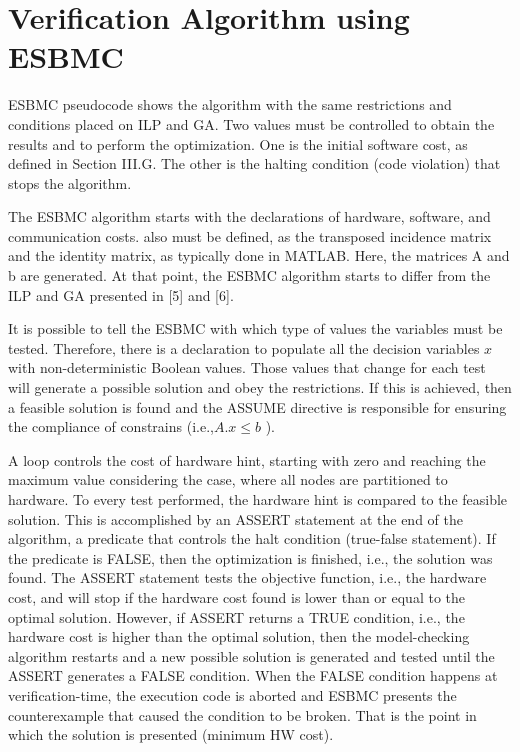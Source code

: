 \section{Verification Algorithm using ESBMC}

ESBMC pseudocode shows the algorithm with the same restrictions and conditions placed on ILP and GA. Two values must be controlled to obtain the results and to perform the optimization. One is the initial software cost, as defined in Section III.G. The other is the halting condition (code violation) that stops the algorithm.

The ESBMC algorithm starts with the declarations of hardware, software, and communication costs.  also must be defined, as the transposed incidence matrix and the identity matrix, as typically done in MATLAB. Here, the matrices A and b are generated. At that point, the ESBMC algorithm starts to differ from the ILP and GA presented in [5] and [6].

It is possible to tell the ESBMC with which type of values the variables must be tested. Therefore, there is a declaration to populate all the decision variables $ x $ with non-deterministic Boolean values. Those values that change for each test will generate a possible solution and obey the restrictions. If this is achieved, then a feasible solution is found and the ASSUME directive is responsible for ensuring the compliance of constrains (i.e.,$ A.x \leq b $ ).

A loop controls the cost of hardware hint, starting with zero and reaching the maximum value considering the case, where all nodes are partitioned to hardware. To every test performed, the hardware hint is compared to the feasible solution. This is accomplished by an ASSERT statement at the end of the algorithm, a predicate that controls the halt condition (true-false statement). If the predicate is FALSE, then the optimization is finished, i.e., the solution was found. The ASSERT statement tests the objective function, i.e., the hardware cost, and will stop if the hardware cost found is lower than or equal to the optimal solution. However, if ASSERT returns a TRUE condition, i.e., the hardware cost is higher than the optimal solution, then the model-checking algorithm restarts and a new possible solution is generated and tested until the ASSERT generates a FALSE condition. When the FALSE condition happens at verification-time, the execution code is aborted and ESBMC presents the counterexample that caused the condition to be broken. That is the point in which the solution is presented (minimum HW cost).

